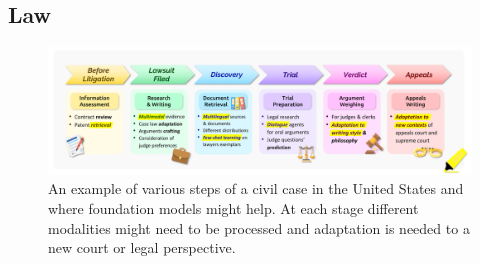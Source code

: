 \newsection
\subsection{Law}
\label{sec:law}


\begin{figure}[!ht]
  \centering
\includegraphics[width=\linewidth]{applications/law_figs/Law.png}
\caption{\label{fig:law2} An example of various steps of a civil case in the United States and where foundation models might help. At each stage different modalities might need to be processed and adaptation is needed to a new court or legal perspective.}
\end{figure}

